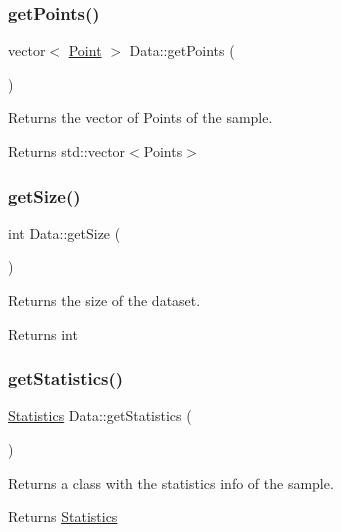 \subsubsection{\texorpdfstring{get\+Points()}{getPoints()}}
{\footnotesize\ttfamily vector$<$ \hyperlink{class_point}{Point} $>$ Data\+::get\+Points (\begin{DoxyParamCaption}{ }\end{DoxyParamCaption})}



Returns the vector of Points of the sample. 

\begin{DoxyReturn}{Returns}
std\+::vector$<$\+Points$>$ 
\end{DoxyReturn}
\mbox{\label{class_data_abfd7c7cca66a186ff45efa430bcb2f1e}} 
\subsubsection{\texorpdfstring{get\+Size()}{getSize()}}
{\footnotesize\ttfamily int Data\+::get\+Size (\begin{DoxyParamCaption}{ }\end{DoxyParamCaption})}



Returns the size of the dataset. 

\begin{DoxyReturn}{Returns}
int 
\end{DoxyReturn}
\mbox{\label{class_data_a26376768a100f1999ef3ac15a2aa2a67}} 
\subsubsection{\texorpdfstring{get\+Statistics()}{getStatistics()}}
{\footnotesize\ttfamily \hyperlink{class_statistics}{Statistics} Data\+::get\+Statistics (\begin{DoxyParamCaption}{ }\end{DoxyParamCaption})}



Returns a class with the statistics info of the sample. 

\begin{DoxyReturn}{Returns}
\hyperlink{class_statistics}{Statistics} 
\end{DoxyReturn}
\mbox{\label{class_data_abb6aade47d78a284301c32e82b2cbee2}} 
